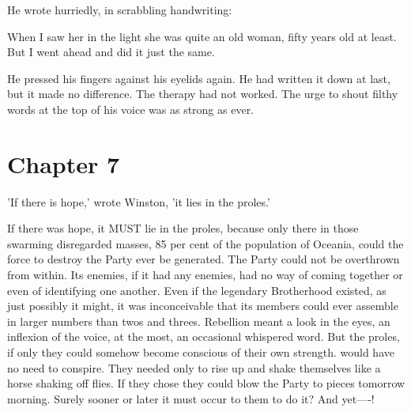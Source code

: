 \documentclass{article}
\begin{document}
He wrote hurriedly, in scrabbling handwriting:


   When I saw her in the light she was quite an old woman, fifty years old
at least. But I went ahead and did it just the same.


He pressed his fingers against his eyelids again. He had written it down
at last, but it made no difference. The therapy had not worked. The urge
to shout filthy words at the top of his voice was as strong as ever.




\section{Chapter 7}



'If there is hope,' wrote Winston, 'it lies in the proles.'

If there was hope, it MUST lie in the proles, because only there in those
swarming disregarded masses, 85 per cent of the population of Oceania,
could the force to destroy the Party ever be generated. The Party could
not be overthrown from within. Its enemies, if it had any enemies, had
no way of coming together or even of identifying one another. Even if
the legendary Brotherhood existed, as just possibly it might, it was
inconceivable that its members could ever assemble in larger numbers than
twos and threes. Rebellion meant a look in the eyes, an inflexion of the
voice, at the most, an occasional whispered word. But the proles, if only
they could somehow become conscious of their own strength. would have no
need to conspire. They needed only to rise up and shake themselves like
a horse shaking off flies. If they chose they could blow the Party to
pieces tomorrow morning. Surely sooner or later it must occur to them to
do it? And yet----!
\end{document}
